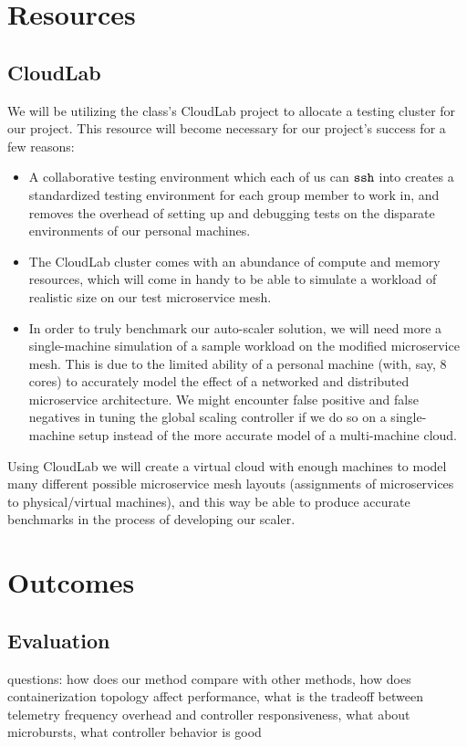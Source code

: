 \documentclass{proposal}
\begin{document}
\section{Resources}
\subsection{CloudLab}
We will be utilizing the class's CloudLab project to allocate a testing cluster for our project. This resource will become necessary for our project's success for a few reasons:
\begin{itemize}
    \item A collaborative testing environment which each of us can $\tt ssh$ into creates a standardized testing environment for each group member to work in, and removes the overhead of setting up and debugging tests on the disparate environments of our personal machines.
    \item The CloudLab cluster comes with an abundance of compute and memory resources, which will come in handy to be able to simulate a workload of realistic size on our test microservice mesh.
    \item In order to truly benchmark our auto-scaler solution, we will need more a single-machine simulation of a sample workload on the modified microservice mesh. This is due to the limited ability of a personal machine (with, say, 8 cores) to accurately model the effect of a networked and distributed microservice architecture. We might encounter false positive and false negatives in tuning the global scaling controller if we do so on a single-machine setup instead of the more accurate model of a multi-machine cloud.
\end{itemize}
Using CloudLab we will create a virtual cloud with enough machines to model many different possible microservice mesh layouts (assignments of microservices to physical/virtual machines), and this way be able to produce accurate benchmarks in the process of developing our scaler.

\section{Outcomes}
\subsection{Evaluation}
questions: how does our method compare with other methods, how does containerization topology affect performance, what is the tradeoff between telemetry frequency overhead and controller responsiveness, what about microbursts, what controller behavior is good
\end{document}
